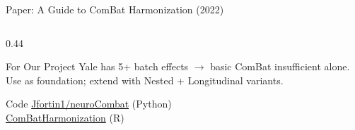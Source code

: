 \documentclass[aspectratio=169,xcolor=dvipsnames]{beamer}
\begin{document}
\begin{frame}{Paper: A Guide to ComBat Harmonization (2022)}
\begin{columns}
\begin{column}{0.44\textwidth}
            \begin{alertblock}{For Our Project}
                \small
                Yale has 5+ batch effects $\to$ basic ComBat insufficient alone. Use as foundation; extend with Nested + Longitudinal variants.
            \end{alertblock}

            \begin{exampleblock}{\scriptsize {} Code}
                \scriptsize \href{https://github.com/Jfortin1/neuroCombat}{Jfortin1/neuroCombat} (Python)\\
                \href{https://github.com/Jfortin1/ComBatHarmonization}{ComBatHarmonization} (R)
            \end{exampleblock}
        \end{column}
    \end{columns}
\end{frame}
\end{document}
